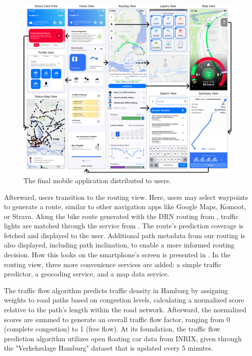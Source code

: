 \begin{figure}[t]
\caption{The final mobile application distributed to users.}\label{fig:app}
\includegraphics[width=\linewidth]{images/app.png}
\end{figure}

Afterward, users transition to the routing view. Here, users may select waypoints to generate a route, similar to other navigation apps like Google Maps, Komoot, or Strava. Along the bike route generated with the DRN routing from , traffic lights are matched through the service from . The route's prediction coverage is fetched and displayed to the user. Additional path metadata from our routing is also displayed, including path inclination, to enable a more informed routing decision. How this looks on the smartphone's screen is presented in . In the routing view, three more convenience services are added: a simple traffic predictor, a geocoding service, and a map data service.

The traffic flow algorithm predicts traffic density in Hamburg by assigning weights to road paths based on congestion levels, calculating a normalized score relative to the path's length within the road network. Afterward, the normalized scores are summed to generate an overall traffic flow factor, ranging from 0 (complete congestion) to 1 (free flow). At its foundation, the traffic flow prediction algorithm utilizes open floating car data from INRIX, given through the "Verkehrslage Hamburg" dataset that is updated every 5 minutes.

